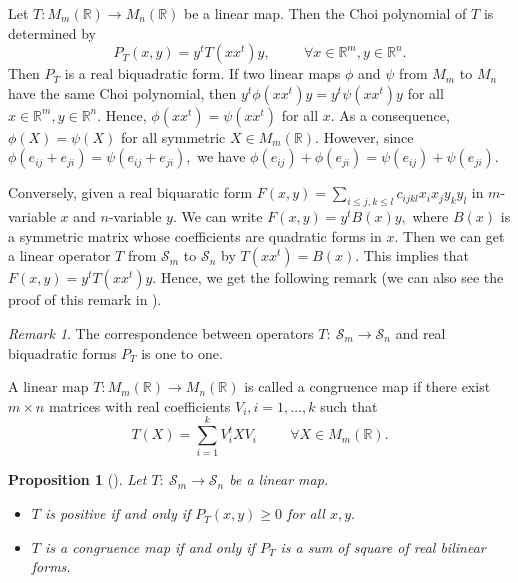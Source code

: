 \documentclass[12pt,a4paper]{amsart}
\theoremstyle{plain}
\newtheorem{proposition}[theorem]{Proposition}
\theoremstyle{remark}
\newtheorem{remark}{Remark}
\theoremstyle{definition}
\def \R {\mathbb{R}}
\def \cS {\mathcal{S}}
\begin{document}
Let $T: M_m(\R) \longrightarrow M_n(\R)$ be a linear map. Then the Choi polynomial of $T$ is determined by  
$$
P_T (x,y)= y^t T(xx^t)y, \hspace{1cm} \forall x\in \R^m, y\in \R^n.
$$ 
Then $P_T$ is a real biquadratic form. If two linear maps $\phi$ and $\psi$ from $M_m$ to $M_n$ have the same Choi polynomial, then
$y^t\phi(xx^t)y = y^t\psi(xx^t)y$ for all $x\in \R^m, y\in \R^n.$ Hence, $\phi(xx^t) = \psi(xx^t)$ for all $x.$ As a consequence, $\phi(X) =\psi(X)$ for all symmetric 
$X\in M_m(\R).$ However, since $\phi(e_{ij} + e_{ji}) = \psi(e_{ij} + e_{ji}),$ we have $\phi (e_{ij}) + \phi(e_{ji}) =\psi (e_{ij}) + \psi(e_{ji}).$ 



Conversely, given a real biquaratic form $\displaystyle F(x,y) = \sum_{i\le j,k\le l}c_{ijkl} x_ix_jy_ky_l$ 
 in $m$-variable $x$ and $n$-variable $y.$ We can write $F(x,y) = y^tB(x) y,$ where $B(x)$ is a symmetric matrix whose coefficients are quadratic forms in $x.$ Then we can get a linear operator $T$ from $\cS_m$ to $\cS_n$ by $T(xx^t) = B(x).$ This implies that $F(x,y) = y^t T(xx^t) y.$ 
Hence, we get the following remark (we can also see the proof of this remark in \cite{Choi75a}).
\begin{remark}%
The correspondence between operators $T: \ \cS_m \to \cS_n $ and real biquadratic forms $P_T $ is one to one. 
\end{remark}


A linear map $T: M_m(\R) \longrightarrow M_n(\R)$ is called a congruence map if there exist $m\times n$ matrices with real coefficients $V_i, i=1,\ldots, k$ such that
$$
T(X) = \sum_{i=1}^k V_i^t X V_i \hspace{1cm} \forall X \in M_m(\R).
$$   
\begin{proposition}[\cite{Choi75a}]\label{real1}
Let $T:\ \cS_m \longrightarrow \cS_n$ be a linear map. %
\begin{itemize}
	\item[(a)] $T$ is positive if and only if $P_T(x,y) \ge 0$ for all $x,y.$
	\item[(b)] $T$ is a congruence map if and only if $P_T$ is a sum of square of real bilinear forms. 
\end{itemize}
\end{proposition} 
\end{document}
